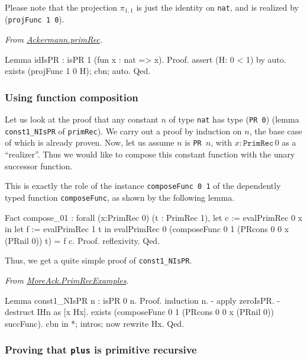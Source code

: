 Please note that the projection $\pi_{1,1}$ is just the identity on \texttt{nat}, and is realized by 
(\texttt{projFunc 1 0}).


\vspace{4pt}
\noindent
\emph{From \href{../theories/html/hydras.primRec.html}{Ackermann.primRec}.}

\begin{Coqsrc}
Lemma idIsPR : isPR 1 (fun x : nat => x).
Proof.
  assert (H: 0 < 1) by auto.
  exists (projFunc 1 0 H); cbn; auto.
Qed.
\end{Coqsrc}

\subsubsection{Using function composition}

Let us look at the proof that any constant $n$ of type \texttt{nat} has type (\texttt{PR 0})
(lemma  \texttt{const1\_NIsPR} of \texttt{primRec}). We carry out a proof by induction on $n$, the base case of which is already proven.
Now, let us assume $n$ is \texttt{PR $n$}, with $x:\texttt{PrimRec}\,0$ as a ``realizer''.
Thus we would like to compose this constant function with the unary successor function.

This is exactly the role of the instance \texttt{composeFunc 0 1} of the dependently typed
function \texttt{composeFunc}, as shown by the following lemma.

\begin{Coqsrc}
Fact compose_01 :
    forall (x:PrimRec 0) (t : PrimRec 1),
    let c := evalPrimRec 0 x in
    let f := evalPrimRec 1 t in
    evalPrimRec 0 (composeFunc 0 1
                               (PRcons 0 0 x (PRnil 0))
                               t)  =
     f c.
Proof. reflexivity. Qed.
\end{Coqsrc}

Thus, we get a quite simple proof of \texttt{const1\_NIsPR}.


\vspace{4pt}
\noindent
\emph{From \href{../theories/html/hydras.MoreAck.PrimRecExamples.html}{MoreAck.PrimRecExamples}}.
\begin{Coqsrc}
Lemma  const1_NIsPR n : isPR 0 n. 
Proof.
  induction n.
  - apply zeroIsPR.
  - destruct IHn as [x Hx].
   exists (composeFunc 0 1 (PRcons 0 0 x (PRnil 0)) succFunc). 
   cbn in *; intros; now rewrite Hx.
Qed.
\end{Coqsrc}


\subsubsection{Proving that \texttt{plus} is primitive recursive}

